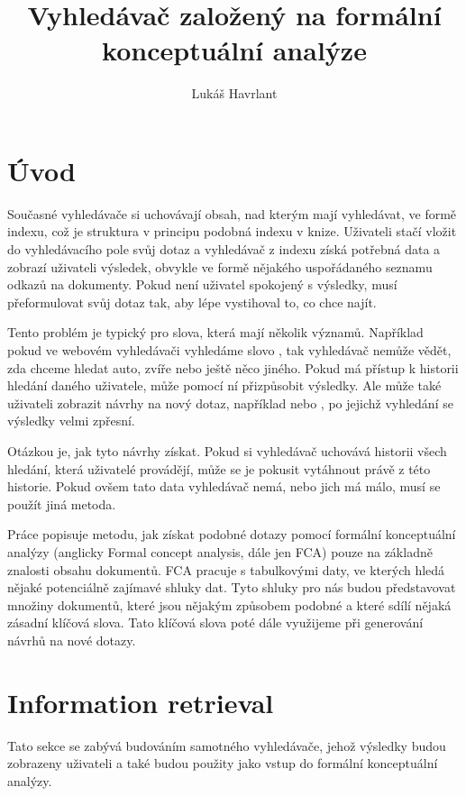\documentclass[12pt]{article}
\title{Vyhledávač založený na formální konceptuální analýze}
\author{Lukáš Havrlant}
\begin{document}
\maketitle
\newpage


\section*{Úvod}

Současné vyhledávače si uchovávají obsah, nad kterým mají vyhledávat, ve formě indexu, což je struktura v principu podobná indexu v knize. Uživateli stačí vložit do vyhledávacího pole svůj dotaz a vyhledávač z indexu získá potřebná data a zobrazí uživateli výsledek, obvykle ve formě nějakého uspořádaného seznamu odkazů na dokumenty. Pokud není uživatel spokojený s výsledky, musí přeformulovat svůj dotaz tak, aby lépe vystihoval to, co chce najít. 

Tento problém je typický pro slova, která mají několik významů. Například pokud ve webovém vyhledávači vyhledáme slovo , tak vyhledávač nemůže vědět, zda chceme hledat auto, zvíře nebo ještě něco jiného. Pokud má přístup k historii hledání daného uživatele, může pomocí ní přizpůsobit výsledky. Ale může také uživateli zobrazit návrhy na nový dotaz, například  nebo , po jejichž vyhledání se výsledky velmi zpřesní. 

Otázkou je, jak tyto návrhy získat. Pokud si vyhledávač uchovává historii všech hledání, která uživatelé provádějí, může se je pokusit vytáhnout právě z této historie. Pokud ovšem tato data vyhledávač nemá, nebo jich má málo, musí se použít jiná metoda. 

Práce popisuje metodu, jak získat podobné dotazy pomocí formální konceptuální analýzy (anglicky Formal concept analysis, dále jen FCA) pouze na základně znalosti obsahu dokumentů. FCA pracuje s tabulkovými daty, ve kterých hledá nějaké potenciálně zajímavé shluky dat. Tyto shluky pro nás budou představovat množiny dokumentů, které jsou nějakým způsobem podobné a které sdílí nějaká zásadní klíčová slova. Tato klíčová slova poté dále využijeme při generování návrhů na nové dotazy. 

\newpage
\section{Information retrieval}

Tato sekce se zabývá budováním samotného vyhledávače, jehož výsledky budou zobrazeny uživateli a také budou použity jako vstup do formální konceptuální analýzy. 
\end{document}
